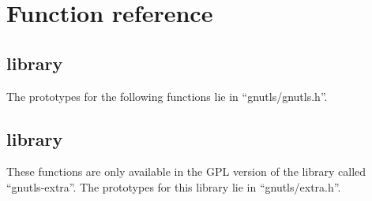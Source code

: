 \chapter{Function reference}

\section{\gnutls{} library}
The prototypes for the following functions lie
in ``gnutls/gnutls.h''.


\newpage

\section{\gnutlse{} library}
These functions are only available in the GPL version of the
library called ``gnutls-extra''. The prototypes for this library lie
in ``gnutls/extra.h''.



